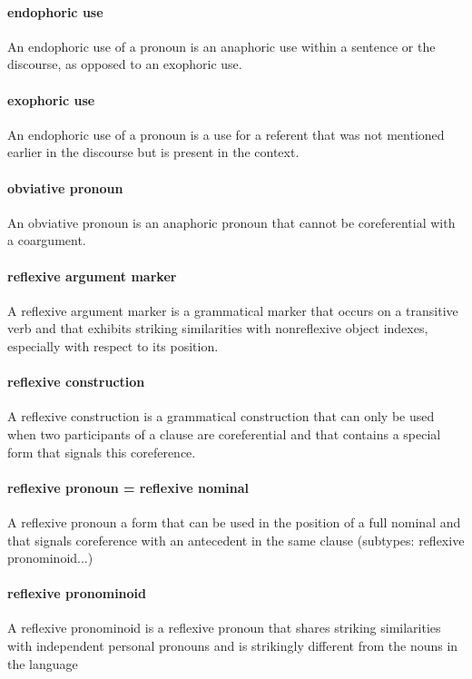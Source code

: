 \documentclass[output=paper]{langscibook}
\begin{document}
\paragraph*{endophoric use} An endophoric use of a pronoun is an anaphoric use within a sentence or the discourse, as opposed to an exophoric use. 

\paragraph*{exophoric use} An endophoric use of a pronoun is a use for a referent that was not mentioned earlier in the discourse but is present in the context.

\paragraph*{obviative pronoun} An obviative pronoun is an anaphoric pronoun that cannot be coreferential with a coargument.

\paragraph*{reflexive argument marker} A reflexive argument marker is a grammatical marker that occurs on a transitive verb and that exhibits striking similarities with nonreflexive object indexes, especially with respect to its position.

\paragraph*{reflexive construction} A reflexive construction is a grammatical construction that can only be used when two participants of a clause are coreferential and that contains a special form that signals this coreference.

\paragraph*{reflexive pronoun = reflexive nominal} A reflexive pronoun a form that can be used in the position of a full nominal and that signals coreference with an antecedent in the same clause (subtypes: reflexive pronominoid...)

\paragraph*{reflexive pronominoid} A reflexive pronominoid is a reflexive pronoun that shares striking similarities with independent personal pronouns and is strikingly different from the nouns in the language
\end{document}
